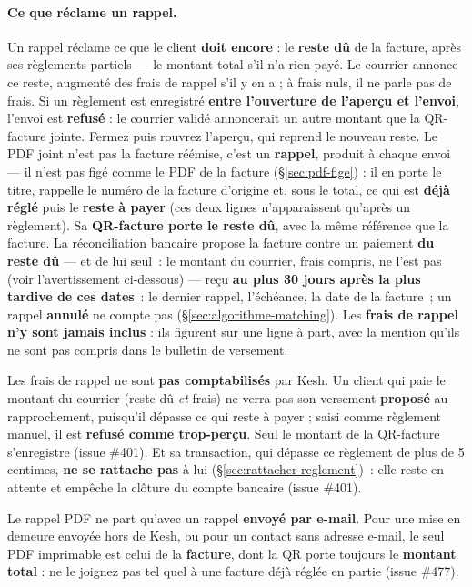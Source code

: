 \documentclass[a4paper,11pt,oneside]{article}
\begin{document}
\paragraph{Ce que réclame un rappel.} Un rappel réclame ce que le client \textbf{doit encore} : le \textbf{reste dû} de la facture, après ses règlements partiels --- le montant total s'il n'a rien payé. Le courrier annonce ce reste, augmenté des frais de rappel s'il y en a ; à frais nuls, il ne parle pas de frais. Si un règlement est enregistré \textbf{entre l'ouverture de l'aperçu et l'envoi}, l'envoi est \textbf{refusé} : le courrier validé annoncerait un autre montant que la QR-facture jointe. Fermez puis rouvrez l'aperçu, qui reprend le nouveau reste. Le PDF joint n'est pas la facture réémise, c'est un \textbf{rappel}, produit à chaque envoi --- il n'est pas figé comme le PDF de la facture (\S\ref{sec:pdf-fige}) : il en porte le titre, rappelle le numéro de la facture d'origine et, sous le total, ce qui est \textbf{déjà réglé} puis le \textbf{reste à payer} (ces deux lignes n'apparaissent qu'après un règlement). Sa \textbf{QR-facture porte le reste dû}, avec la même référence que la facture. La réconciliation bancaire propose la facture contre un paiement \textbf{du reste dû} --- et de lui seul~: le montant du courrier, frais compris, ne l'est pas (voir l'avertissement ci-dessous) --- reçu \textbf{au plus 30 jours après la plus tardive de ces dates}~: le dernier rappel, l'échéance, la date de la facture~; un rappel \textbf{annulé} ne compte pas (\S\ref{sec:algorithme-matching}). Les \textbf{frais de rappel n'y sont jamais inclus} : ils figurent sur une ligne à part, avec la mention qu'ils ne sont pas compris dans le bulletin de versement.

\begin{keshwarning}
Les frais de rappel ne sont \textbf{pas comptabilisés} par Kesh. Un client qui paie le montant du courrier (reste dû \emph{et} frais) ne verra pas son versement \textbf{proposé} au rapprochement, puisqu'il dépasse ce qui reste à payer ; saisi comme règlement manuel, il est \textbf{refusé comme trop-perçu}. Seul le montant de la QR-facture s'enregistre (issue \#401). Et sa transaction, qui dépasse ce règlement de plus de 5 centimes, \textbf{ne se rattache pas} à lui (\S\ref{sec:rattacher-reglement})~: elle reste en attente et empêche la clôture du compte bancaire (issue \#401).
\end{keshwarning}

\begin{keshnote}
Le rappel PDF ne part qu'avec un rappel \textbf{envoyé par e-mail}. Pour une mise en demeure envoyée hors de Kesh, ou pour un contact sans adresse e-mail, le seul PDF imprimable est celui de la \textbf{facture}, dont la QR porte toujours le \textbf{montant total} : ne le joignez pas tel quel à une facture déjà réglée en partie (issue \#477).
\end{keshnote}
\end{document}
